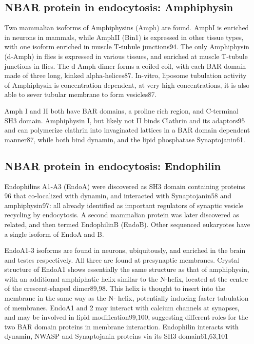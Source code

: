 	\subsection{NBAR protein in endocytosis: Amphiphysin }		
	Two mammalian isoforms of Amphiphysins (Amph) are found. AmphI is enriched in neurons in mammals, while AmphII (Bin1) is expressed in other tissue types, with one isoform enriched in muscle T-tubule junctions94. The only Amphiphysin (d-Amph) in flies is expressed in various tissues, and enriched at muscle T-tubule junctions in flies. The d-Amph dimer forms a coiled coil, with each BAR domain made of three long, kinked alpha-helices87. In-vitro, liposome tubulation activity of Amphiphysin is concentration dependent, at very high concentrations, it is also able to sever tubular membrane to form vesicles87. 


	\vspace{5mm}
	Amph I and II both have BAR domains, a proline rich region, and C-terminal SH3 domain.
Amphiphysin I, but likely not II binds Clathrin and its adaptors95 and can polymerize clathrin into invaginated lattices in a BAR domain dependent manner87, while both bind dynamin, and the lipid phosphatase Synaptojanin61.


	\subsection{NBAR protein in endocytosis: Endophilin }	
	Endophilins A1-A3 (EndoA) were discovered as SH3 domain containing proteins 96 that co-localized with dynamin, and interacted with Synaptojanin58 and amphiphysin97: all already identified as important regulators of synaptic vesicle recycling by endocytosis. A second mammalian protein was later discovered as related, and then termed EndophilinB (EndoB). Other sequenced eukaryotes have a single isoform of EndoA and B.

	\vspace{5mm}
	EndoA1-3 isoforms are found in neurons, ubiquitously, and enriched in the brain and testes respectively. All three are found at presynaptic membranes. Crystal structure of EndoA1 shows essentially the same structure as that of amphiphysin, with an additional amphiphatic helix similar to the N-helix, located at the centre of the crescent-shaped dimer89,98. This helix is thought to insert into the membrane in the same way as the N- helix, potentially inducing faster tubulation of membranes. EndoA1 and 2 may interact with calcium channels at synapses, and may be involved in lipid modification99,100, suggesting different roles for the two BAR domain proteins in membrane interaction. Endophilin interacts with dynamin, NWASP and Synaptojanin proteins via its SH3 domain61,63,101



